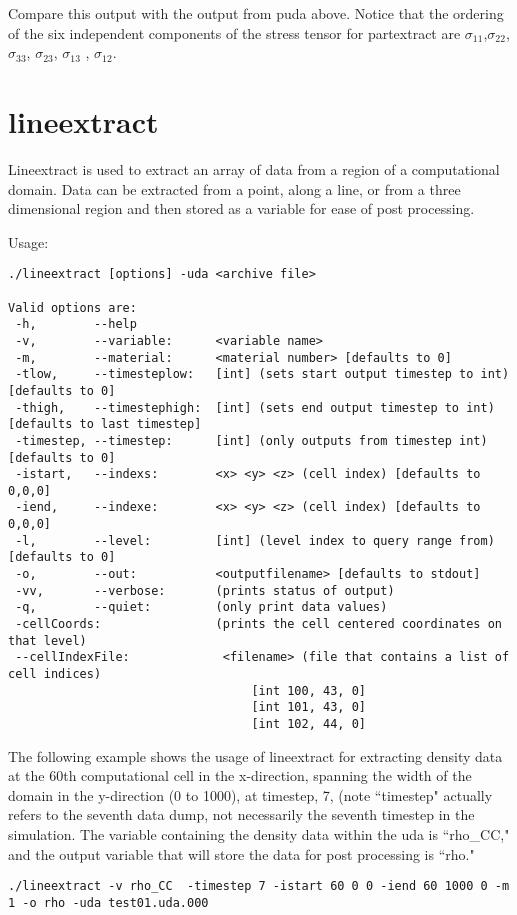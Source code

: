 Compare this output with the output from puda above.  Notice that the
ordering of the six independent components of the stress tensor for
partextract are $\sigma_{11}$,$\sigma_{22}$, $\sigma_{33}$,
$\sigma_{23}$, $\sigma_{13}$ , $\sigma_{12}$.

\section{lineextract}

Lineextract is used to extract an array of data from a region of a
computational domain. Data can be extracted from a point, along a
line, or from a three dimensional region and then stored as a variable
for ease of post processing.

Usage: \begin{Verbatim}[fontsize=\footnotesize]
./lineextract [options] -uda <archive file>

Valid options are:
 -h,        --help
 -v,        --variable:      <variable name>
 -m,        --material:      <material number> [defaults to 0]
 -tlow,     --timesteplow:   [int] (sets start output timestep to int) [defaults to 0]
 -thigh,    --timestephigh:  [int] (sets end output timestep to int) [defaults to last timestep]
 -timestep, --timestep:      [int] (only outputs from timestep int) [defaults to 0]
 -istart,   --indexs:        <x> <y> <z> (cell index) [defaults to 0,0,0]
 -iend,     --indexe:        <x> <y> <z> (cell index) [defaults to 0,0,0]
 -l,        --level:         [int] (level index to query range from) [defaults to 0]
 -o,        --out:           <outputfilename> [defaults to stdout]
 -vv,       --verbose:       (prints status of output)
 -q,        --quiet:         (only print data values)
 -cellCoords:                (prints the cell centered coordinates on that level)
 --cellIndexFile:             <filename> (file that contains a list of cell indices)
                                  [int 100, 43, 0]
                                  [int 101, 43, 0]
                                  [int 102, 44, 0]
\end{Verbatim}

The following example shows the usage of lineextract for extracting
density data at the 60th computational cell in the x-direction,
spanning the width of the domain in the y-direction (0 to 1000), at
timestep, 7, (note ``timestep" actually refers to the seventh data
dump, not necessarily the seventh timestep in the simulation. The
variable containing the density data within the uda is ``rho\_CC," and
the output variable that will store the data for post processing is
``rho."
\begin{Verbatim}[fontsize=\footnotesize]
./lineextract -v rho_CC  -timestep 7 -istart 60 0 0 -iend 60 1000 0 -m 1 -o rho -uda test01.uda.000
\end{Verbatim}

